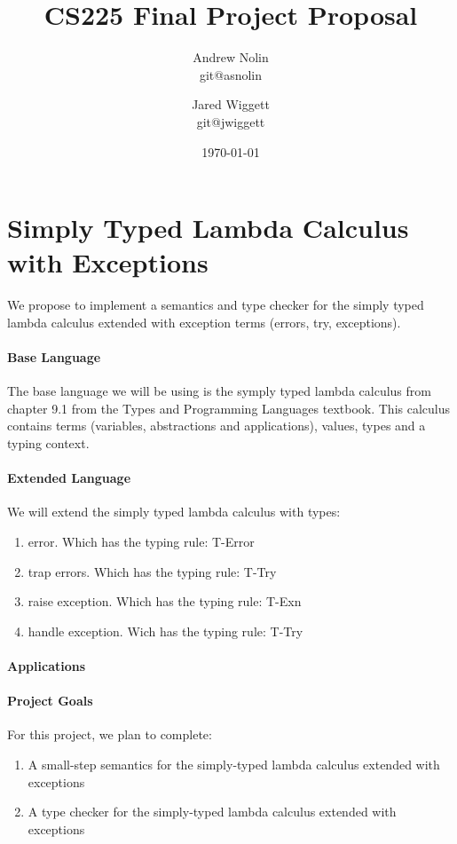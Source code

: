 \documentclass{article}
\title{CS225 Final Project Proposal}
\author{Andrew Nolin \\ git@asnolin \and Jared Wiggett \\ git@jwiggett}
\date{\today}
\begin{document}
\maketitle
\section*{Simply Typed Lambda Calculus with Exceptions}
We propose to implement a semantics and type checker for the simply typed lambda calculus extended with exception terms (errors, try, exceptions). 


\paragraph{Base Language}
The base language we will be using is the symply typed lambda calculus from chapter 9.1 from the Types and Programming Languages textbook. This calculus contains terms (variables, abstractions and  applications), values, types and a typing context.
\paragraph{Extended Language}
We will extend the simply typed lambda calculus with types: 
\begin{enumerate}
	\item error. Which has the typing rule: T-Error
	\item trap errors. Which has the typing rule: T-Try
	\item raise exception. Which has the typing rule: T-Exn
	\item handle exception. Wich has the typing rule: T-Try
\end{enumerate}
\paragraph{Applications}

\paragraph{Project Goals}
For this project, we plan to complete:
\begin{enumerate}
\item A small-step semantics for the simply-typed lambda calculus extended with exceptions
\item A type checker for the simply-typed lambda calculus extended with exceptions
\end{enumerate}
\end{document}
